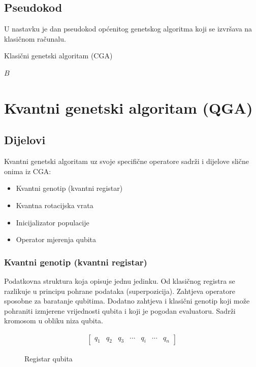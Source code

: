 \documentclass[times, utf8, zavrsni, numeric]{fer}
\begin{document}
\subsection{Pseudokod}
U nastavku je dan pseudokod općenitog genetskog algoritma koji se izvršava na klasičnom računalu.
\begin{algorithm}
\caption{Klasični genetski algoritam (CGA)}
\label{algo:cga}
\begin{algorithmic}
\ENDWHILE
\RETURN $B$
\end{algorithmic}
\end{algorithm}

\newpage

\section{Kvantni genetski algoritam (QGA)}
\subsection{Dijelovi}
Kvantni genetski algoritam uz svoje specifične operatore sadrži i dijelove slične onima iz CGA:
\begin{itemize}
\item Kvantni genotip (kvantni registar)
\item Kvantna rotacijska vrata
\item Inicijalizator populacije
\item Operator mjerenja qubita
\end{itemize}

\subsubsection{Kvantni genotip (kvantni registar)}
Podatkovna struktura koja opisuje jednu jedinku. Od klasičnog registra se razlikuje u principu pohrane podataka (superpozicija). Zahtjeva operatore sposobne za baratanje qubitima. Dodatno zahtjeva i klasični genotip koji može pohraniti izmjerene vrijednosti qubita i koji je pogodan evaluatoru. Sadrži kromosom u obliku niza qubita.
\begin{figure}[htb]
\centering
\begin{align*}
\begin{bmatrix}
q_1 & q_2 & q_3 & \cdots & q_i & \cdots & q_n
\end{bmatrix}
\end{align*}
\caption{Registar qubita}
\end{figure}
\end{document}
